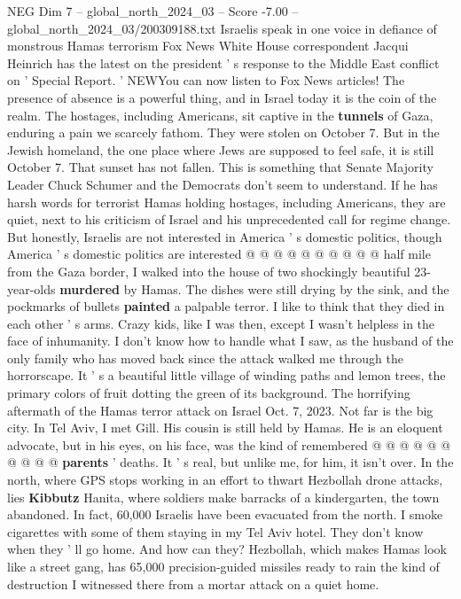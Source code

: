 \begin{textsample}{NEG Dim 7 – global\_north\_2024\_03 – Score -7.00 – global\_north\_2024\_03/200309188.txt}  \label{ex:f7_neg_240}
Israelis speak in one voice in defiance of monstrous Hamas terrorism Fox News White House correspondent Jacqui Heinrich has the latest on the president ' s response to the Middle East conflict on ' Special Report. ' NEWYou can now listen to Fox News articles!
The presence of absence is a powerful thing, and in Israel today it is the coin of the realm.
The hostages, including Americans, sit captive in the \textbf{tunnels} of Gaza, enduring a pain we scarcely fathom.
They were stolen on October 7.
But in the Jewish homeland, the one place where Jews are supposed to feel safe, it is still October 7.
That sunset has not fallen.
This is something that Senate Majority Leader Chuck Schumer and the Democrats don't seem to understand.
If he has harsh words for terrorist Hamas holding hostages, including Americans, they are quiet, next to his criticism of Israel and his unprecedented call for regime change.
But honestly, Israelis are not interested in America ' s domestic politics, though America ' s domestic politics are interested @ @ @ @ @ @ @ @ @ @ half mile from the Gaza border, I walked into the house of two shockingly beautiful 23-year-olds \textbf{murdered} by Hamas.
The dishes were still drying by the sink, and the pockmarks of bullets \textbf{painted} a palpable terror.
I like to think that they died in each other ' s arms.
Crazy kids, like I was then, except I wasn't helpless in the face of inhumanity.
I don't know how to handle what I saw, as the husband of the only family who has moved back since the attack walked me through the horrorscape.
It ' s a beautiful little village of winding paths and lemon trees, the primary colors of fruit dotting the green of its background.
The horrifying aftermath of the Hamas terror attack on Israel Oct. 7, 2023.
Not far is the big city.
In Tel Aviv, I met Gill.
His cousin is still held by Hamas.
He is an eloquent advocate, but in his eyes, on his face, was the kind of remembered @ @ @ @ @ @ @ @ @ @ \textbf{parents} ' deaths.
It ' s real, but unlike me, for him, it isn't over.
In the north, where GPS stops working in an effort to thwart Hezbollah drone attacks, lies \textbf{Kibbutz} Hanita, where soldiers make barracks of a kindergarten, the town abandoned.
In fact, 60,000 Israelis have been evacuated from the north.
I smoke cigarettes with some of them staying in my Tel Aviv hotel.
They don't know when they ' ll go home.
And how can they?
Hezbollah, which makes Hamas look like a street gang, has 65,000 precision-guided missiles ready to rain the kind of destruction I witnessed there from a mortar attack on a quiet home.

\end{textsample}
